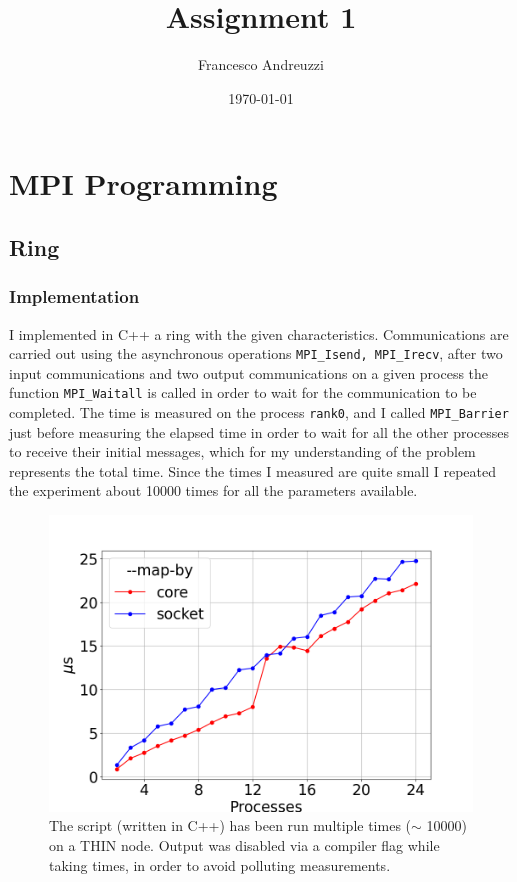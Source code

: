 \documentclass{article}
\title{Assignment 1}
\author{Francesco Andreuzzi}
\date{\today}
\begin{document}
\maketitle

\section{MPI Programming}

\subsection{Ring}

\subsubsection{Implementation}
I implemented in C++ a ring with the given characteristics. Communications are carried out using the asynchronous operations \texttt{MPI\_Isend, MPI\_Irecv}, after two input communications and two output communications on a given process the function \texttt{MPI\_Waitall} is called in order to wait for the communication to be completed. The time is measured on the process \texttt{rank0}, and I called \texttt{MPI\_Barrier} just before measuring the elapsed time in order to wait for all the other processes to receive their initial messages, which for my understanding of the problem represents the total time. Since the times I measured are quite small I repeated the experiment about 10000 times for all the parameters available.

\begin{figure}[t]
    \centering
    \includegraphics[width=\textwidth]{ring/fig.png}
    \caption{The script (written in C++) has been run multiple times ($\sim$ 10000) on a THIN node. Output was disabled via a compiler flag while taking times, in order to avoid polluting measurements.}
    \label{fig:ring_performance}
\end{figure}
\end{document}
